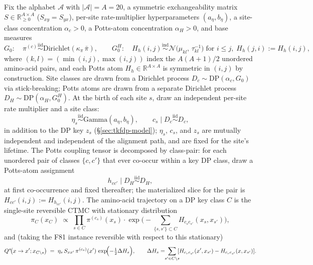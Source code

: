 \begin{definition}
Fix the alphabet $\mathcal{A}$ with $|\mathcal{A}| = A = 20$, a
symmetric exchangeability matrix
$S \in \mathbb{R}^{A \times A}_{\geq 0}$ ($S_{xy} = S_{yx}$),
per-site rate-multiplier hyperparameters $(a_\eta, b_\eta)$, a
site-class concentration $\alpha_c > 0$, a Potts-atom concentration
$\alpha_H > 0$, and base measures
\[
    G_0: \quad \pi^{(c)} \stackrel{\text{iid}}{\sim}
              \mathrm{Dirichlet}(\kappa_\pi\, \bar\pi),
    \qquad
    G_0^H: \quad H_h(i, j) \stackrel{\text{ind}}{\sim}
              \mathcal{N}\!\bigl(\mu_{kl},\, \tau_{kl}^{-1}\bigr)
              \;\text{for } i \leq j,\;
              H_h(j, i) := H_h(i, j),
\]
where $(k, l) = (\min(i, j), \max(i, j))$ index the $A(A+1)/2$
unordered amino-acid pairs, and each Potts atom
$H_h \in \mathbb{R}^{A \times A}$ is symmetric in $(i, j)$ by
construction. Site classes are drawn from a Dirichlet process
$D_c \sim \mathrm{DP}(\alpha_c, G_0)$ via stick-breaking; Potts
atoms are drawn from a separate Dirichlet process
$D_H \sim \mathrm{DP}(\alpha_H, G_0^H)$. At the birth of each site
$s$, draw an independent per-site rate multiplier and a site class:
\[
    \eta_s \stackrel{\text{iid}}{\sim} \mathrm{Gamma}(a_\eta, b_\eta),
    \qquad
    c_s \mid D_c \stackrel{\text{iid}}{\sim} D_c,
\]
in addition to the DP key $z_s$
(\S\ref{sec:tkfdp-model}); $\eta_s$, $c_s$, and $z_s$ are mutually
independent and independent of the alignment path, and are fixed
for the site's lifetime. The Potts coupling tensor is decomposed by
class-pair: for each unordered pair of classes $\{c, c'\}$ that ever
co-occur within a key DP class, draw a Potts-atom assignment
\[
    h_{cc'} \mid D_H \stackrel{\text{iid}}{\sim} D_H,
\]
at first co-occurrence and fixed thereafter; the materialized slice
for the pair is $H_{c c'}(i, j) := H_{h_{cc'}}(i, j)$. The
amino-acid trajectory on a DP key class $C$ is the single-site
reversible CTMC with stationary distribution
\[
    \pi_C(x_C) \;\propto\; \prod_{s \in C} \pi^{(c_s)}(x_s) \cdot
    \exp\!\Big(-\!\!\sum_{\{s, s'\} \subset C}\!\! H_{c_s c_{s'}}(x_s, x_{s'}) \Big),
\]
and (taking the F81 instance reversible with respect to this
stationary)
\[
    Q^s\!\bigl(x \to x'; x_{C \setminus s}\bigr)
    \;=\; \eta_s\, S_{xx'}\, \pi^{(c_s)}(x')\,
    \exp\!\Bigl(-\tfrac{1}{2} \Delta H_s\Bigr),
    \qquad
    \Delta H_s = \!\!\sum_{s' \in C \setminus s}\!\![H_{c_s c_{s'}}(x', x_{s'}) - H_{c_s c_{s'}}(x, x_{s'})].
\]
\end{definition}

